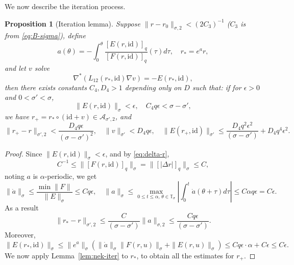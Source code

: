 \documentclass[12pt,reqno]{amsart}
\newtheorem{prop}[thm]{Proposition}
\theoremstyle{remark}
\begin{document}
We now describe the iteration process. 
\begin{prop}
	[Iteration lemma] \label{prop:iter} Suppose $\|r - r_0\|_{\sigma, 2} < (2C_3)^{-1}$ ($C_3$ is from \eqref{eq:B-sigma}), define 
	\begin{equation}
		\label{eq:a-iter} 
		a(\theta) = - \int_0^\theta \frac{[E(r, {\mathrm{id}})]_q}{[F(r, {\mathrm{id}})]_q} (\tau) d\tau, \quad r_* = e^a r,
	\end{equation}
	and let $v$ solve
	\begin{equation}
		\label{eq:v}
		\nabla^*(L_{12}(r_*, {\mathrm{id}}) \nabla v) = - E(r_*, {\mathrm{id}}), 
	\end{equation}
	then there exists constants $C_4, D_4 > 1$ depending only on $D$ such that: if for $\epsilon > 0$ and $0 < \sigma' < \sigma$,  
	\[
	 \|E(r, {\mathrm{id}})\|_\sigma < \epsilon, \quad C_4 q \epsilon < \sigma - \sigma',
	\]
	we have $r_+ = r_* \circ ({\mathrm{id}} + v) \in {\mathcal{A}}_{\sigma', 2}$, and 
	\[
		\|r_+ - r\|_{\sigma', 2} < \frac{D_4 q\epsilon}{(\sigma - \sigma')^2} , \quad
		\|v\|_{\sigma'} < D_4  q \epsilon, \quad
		\|E(r_+, {\mathrm{id}})\|_{\sigma'} \le  \frac{D_4  q^2\epsilon^2}{(\sigma - \sigma')} + D_4 q^4 \epsilon^2. 
	\]
\end{prop}

\begin{proof}
	Since $\|E(r, {\mathrm{id}})\|_\sigma < \epsilon$, and by \eqref{eq:delta-r}, 
	\[
		C^{-1} \le \|[F(r, {\mathrm{id}})]_q\|_\sigma = \|[|\Delta r|]_q\|_\sigma \le C, 
	\]
	noting $a$ is $\alpha$-periodic, we get 
	\[
		\|\dot{a}\|_{\sigma} \le \frac{\min \|F\|}{\|E\|_\sigma} \le C q \epsilon, \quad
		\|a\|_\sigma \le  \max_{0 \le t \le \alpha, \,  \theta \in {\mathbb{T}}_\sigma} \left|\int_0^t \dot{a}(\theta + \tau) d\tau \right| \le C \alpha q \epsilon = C \epsilon. 
	\]
	As a result
	\[
		\|r_* - r\|_{\sigma', 2} \le \frac{C}{(\sigma - \sigma')} \|a\|_{\sigma,2} \le \frac{Cq\epsilon}{(\sigma - \sigma')}. 
	\]
	Moreover, 
	\[
		\|E(r_*, {\mathrm{id}})\|_{\sigma} \le \|e^a\|_\sigma (\|\dot{a}\|_\sigma \|F(r, u)\|_\sigma + \|E(r, u)\|_\sigma) \le  C q\epsilon \cdot  \alpha + C\epsilon \le C \epsilon. 
	\]
	We now apply Lemma~\ref{lem:nek-iter} to $r_*$, to obtain all the estimates for $r_+$. 
\end{proof}
\end{document}
